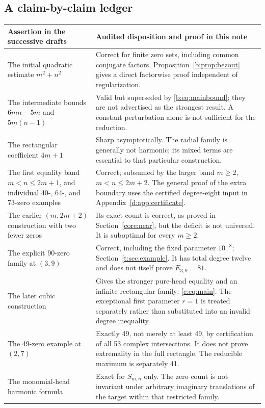 \documentclass[UTF8,11pt]{ctexart}
\theoremstyle{definition}
\numberwithin{equation}{section}
\begin{document}
\subsection{A claim-by-claim ledger}
\small
\begin{longtable}{@{}>{\raggedright\arraybackslash}p{}>{\raggedright\arraybackslash}p{}@{}}
\toprule
Assertion in the successive drafts & Audited disposition and proof in this note \\
\midrule
\endhead
The initial quadratic estimate $m^2+n^2$ & Correct for finite zero sets, including common conjugate factors. Proposition~\ref{b:prop:bezout} gives a direct factorwise proof independent of regularization. \\
The intermediate bounds $6mn-5m$ and $5m(n-1)$ & Valid but superseded by \eqref{b:eq:mainbound}; they are not advertised as the strongest result. A constant perturbation alone is not sufficient for the reduction. \\
The rectangular coefficient $4m+1$ & Sharp asymptotically. The radial family is generally not harmonic; its mixed terms are essential to that particular construction. \\
The first equality band $m<n\le2m+1$, and individual 40-, 64-, and 73-zero examples & Correct; subsumed by the larger band $m\ge2$, $m<n\le2m+2$. The general proof of the extra boundary uses the certified degree-eight input in Appendix~\ref{d:app:certificate}. \\
The earlier $(m,2m+2)$ construction with two fewer zeros & Its exact count is correct, as proved in Section~\ref{core:near}, but the deficit is not universal. It is suboptimal for every $m\ge2$. \\
The explicit 90-zero family at $(3,9)$ & Correct, including the fixed parameter $10^{-8}$; Section~\ref{t:sec:example}. It has total degree twelve and does not itself prove $E_{3,9}=81$. \\
The later cubic construction & Gives the stronger pure-head equality and an infinite rectangular family: \eqref{c:eq:main}. The exceptional first parameter $r=1$ is treated separately rather than substituted into an invalid degree inequality. \\
The 49-zero example at $(2,7)$ & Exactly 49, not merely at least 49, by certification of all 53 complex intersections. It does not prove extremality in the full rectangle. The reducible maximum is separately 41. \\
The monomial-head harmonic formula & Exact for $S_{m,n}$ only. The zero count is not invariant under arbitrary imaginary translations of the target within that restricted family. \\

\end{longtable}
\end{document}
